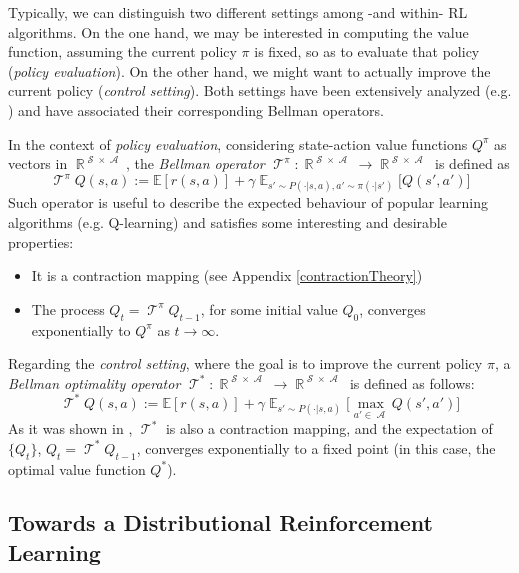 \documentclass[12pt,a4paper,openright,twoside]{article}
\DeclareMathOperator*{\E}{\mathbb{E}}
\DeclareMathOperator*{\R}{\mathbb{R}}
\DeclareMathOperator*{\Sspace}{\mathcal{S}}
\DeclareMathOperator*{\A}{\mathcal{A}}
\DeclareMathOperator*{\T}{\mathcal{T}}
\numberwithin{equation}{section}
\theoremstyle{definition}
\theoremstyle{remark}
\theoremstyle{plain}
\begin{document}
Typically, we can distinguish two different settings among -and within- RL algorithms. On the one hand, we may be interested in computing the value function, assuming the current policy $\pi$ is fixed, so as to evaluate that policy (\textit{policy evaluation}). On the other hand, we might want to actually improve the current policy (\textit{control setting}). Both settings have been extensively analyzed (e.g. \cite{TD}) and have associated their corresponding Bellman operators.


In the context of \textit{policy evaluation}, considering state-action value functions $Q^\pi$ as vectors in $\R^{\Sspace \times \A}$, the \textit{Bellman operator} $\T^{\pi} : \R^{\Sspace \times \A} \rightarrow \R^{\Sspace \times \A}$ is defined as
\begin{equation} \label{BellmanOp}
	{\T}^\pi Q(s,a) :=  \mathbb{E} \left[ r(s,a) \right] + \gamma \E_{s'\sim P(\cdot | s,a), a' \sim \pi(\cdot | s')} \bigg[Q(s',a') \bigg]
\end{equation}
Such operator is useful to describe the expected behaviour of popular learning algorithms (e.g. Q-learning) and satisfies some interesting and desirable properties\cite{rlformulation}:
\begin{itemize}
	\item It is a contraction mapping (see Appendix \ref{contractionTheory})
	\item The process $Q_t = \T^\pi Q_{t-1}$, for some initial value $Q_0$, converges exponentially to $Q^\pi$ as $t \rightarrow \infty$.
\end{itemize}


Regarding the \textit{control setting}, where the goal is to improve the current policy $\pi$, a \textit{Bellman optimality operator} $\T^* : \R^{\Sspace \times \A} \rightarrow \R^{\Sspace \times \A}$ is defined as follows:
\begin{equation} \label{BellmanOptimalityOp}
	{\T}^* Q(s,a) :=  \mathbb{E} \left[ r(s,a) \right] + \gamma \E_{s'\sim P(\cdot | s,a)} \bigg[ \max_{a' \in \A}  Q(s',a') \bigg]
\end{equation}
As it was shown in \cite{rlformulation}, $\T^*$ is also a contraction mapping, and the expectation of $\{ Q_t \}$, $Q_t = \T^* Q_{t-1}$, converges exponentially to a fixed point (in this case, the optimal value function $Q^*$).

\subsection{Towards a Distributional Reinforcement Learning}
\end{document}
